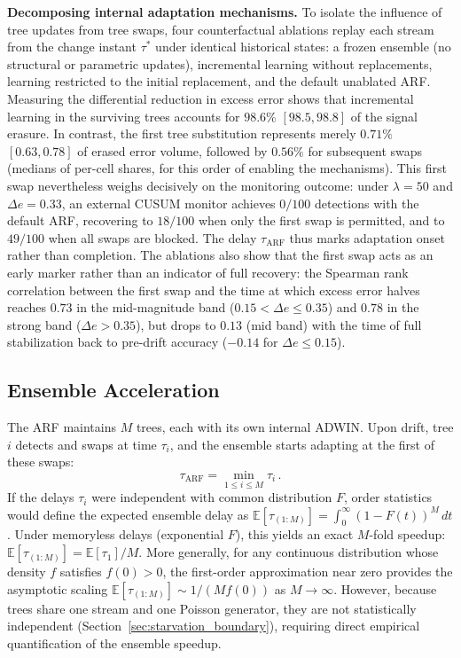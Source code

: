 \documentclass[10pt,conference]{IEEEtran}
\theoremstyle{definition}
\begin{document}
\noindent\textbf{Decomposing internal adaptation mechanisms.}
To isolate the influence of tree updates from tree swaps, four counterfactual ablations replay each stream from the change instant $\tau^*$ under identical historical states: a frozen ensemble (no structural or parametric updates), incremental learning without replacements, learning restricted to the initial replacement, and the default unablated ARF. Measuring the differential reduction in excess error shows that incremental learning in the surviving trees accounts for $98.6\%$ $[98.5, 98.8]$ of the signal erasure. In contrast, the first tree substitution represents merely $0.71\%$ $[0.63, 0.78]$ of erased error volume, followed by $0.56\%$ for subsequent swaps (medians of per-cell shares, for this order of enabling the mechanisms). This first swap nevertheless weighs decisively on the monitoring outcome: under $\lambda = 50$ and $\Delta e = 0.33$, an external CUSUM monitor achieves $0/100$ detections with the default ARF, recovering to $18/100$ when only the first swap is permitted, and to $49/100$ when all swaps are blocked. The delay $\tau_{\mathrm{ARF}}$ thus marks adaptation onset rather than completion. The ablations also show that the first swap acts as an early marker rather than an indicator of full recovery: the Spearman rank correlation between the first swap and the time at which excess error halves reaches $0.73$ in the mid-magnitude band ($0.15 < \Delta e \le 0.35$) and $0.78$ in the strong band ($\Delta e > 0.35$), but drops to $0.13$ (mid band) with the time of full stabilization back to pre-drift accuracy ($-0.14$ for $\Delta e \le 0.15$).

\subsection{Ensemble Acceleration}\label{sec:hydra}

The ARF maintains $M$ trees, each with its own internal ADWIN.
Upon drift, tree $i$ detects and swaps at time $\tau_i$, and the ensemble starts adapting at the first of these swaps:
\begin{equation}\label{eq:hydra}
  \tau_{\mathrm{ARF}} = \min_{1 \le i \le M} \tau_i\,.
\end{equation}
If the delays $\tau_i$ were independent with common distribution $F$, order statistics~\cite{david_order_2003} would define the expected ensemble delay as $\mathbb{E}[\tau_{(1:M)}] = \int_0^{\infty} (1 - F(t))^M \, dt$.
Under memoryless delays (exponential $F$), this yields an exact $M$-fold speedup: $\mathbb{E}[\tau_{(1:M)}] = \mathbb{E}[\tau_1] / M$.
More generally, for any continuous distribution whose density $f$ satisfies $f(0) > 0$, the first-order approximation near zero provides the asymptotic scaling $\mathbb{E}[\tau_{(1:M)}] \sim 1 / (M f(0))$ as $M \to \infty$.
However, because trees share one stream and one Poisson generator, they are not statistically independent (Section~\ref{sec:starvation_boundary}), requiring direct empirical quantification of the ensemble speedup.
\end{document}
